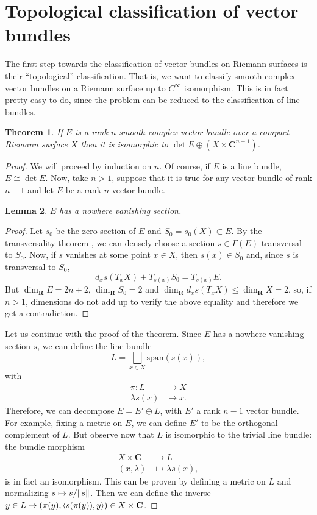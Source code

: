 \documentclass[12pt,a4paper]{book}
\newtheorem{thm}{Theorem}[section]
\newtheorem{lema}[thm]{Lemma}
\theoremstyle{definition} \newtheorem{defn}[thm]{Definition}
\theoremstyle{definition} \newtheorem{ejemplo}[thm]{Example}
\theoremstyle{remark} \newtheorem{rem}[thm]{Remark}
\def\CC{\mathbf{C}}
\def\RR{\mathbf{R}}
\def\Span{\mathrm{span}}
\DeclarePairedDelimiter\esc{\langle}{\rangle}
\DeclarePairedDelimiter\norm{\lVert}{\rVert}
\begin{document}
\section{Topological classification of vector bundles}
The first step towards the classification of vector bundles on Riemann surfaces is their ``topological'' classification. That is, we want to classify smooth complex vector bundles on a Riemann surface up to $C^\infty$ isomorphism. This is in fact pretty easy to do, since the problem can be reduced to the classification of line bundles.
\begin{thm}
  If $E$ is a rank $n$ smooth complex vector bundle over a compact Riemann surface $X$ then it is isomorphic to $\det E \oplus (X\times \CC^{n-1})$.
\end{thm}
\begin{proof}
   We will proceed by induction on $n$. Of course, if $E$ is a line bundle, $E\cong \det E$. Now, take $n>1$, suppose that it is true for any vector bundle of rank $n-1$ and let $E$ be a rank $n$ vector bundle.
   \begin{lema}
     $E$ has a nowhere vanishing section.
   \end{lema}
   \begin{proof}
     Let $s_0$ be the zero section of $E$ and $S_0=s_0(X)\subset E$. By the transversality theorem \cite{hirsch}, we can densely choose a section $s\in \Gamma(E)$ transversal to $S_0$. Now, if $s$ vanishes at some point $x\in X$, then $s(x)\in S_0$ and, since $s$ is transversal to $S_0$, $$d_xs(T_xX) + T_{s(x)}S_0 = T_{s(x)}E.$$ But $\dim_\RR E=2n+2$, $\dim_\RR S_0 = 2$ and $\dim_\RR d_xs(T_xX) \leq \dim_\RR X = 2$, so, if $n>1$, dimensions do not add up to verify the above equality and therefore we get a contradiction. 
   \end{proof}

   Let us continue with the proof of the theorem. Since $E$ has a nowhere vanishing section $s$, we can define the line bundle
   \begin{equation*}
     L=\bigsqcup_{x\in X} \Span(s(x)),
   \end{equation*}
   with 
   \begin{align*}
      \pi:L&\longrightarrow X\\ 
       \lambda s(x) &\longmapsto x.
     \end{align*}
     Therefore, we can decompose $E=E'\oplus L$, with $E'$ a rank $n-1$ vector bundle. For example, fixing a metric on $E$, we can define $E'$ to be the orthogonal complement of $L$. But observe now that $L$ is isomorphic to the trivial line bundle: the bundle morphism
     \begin{align*}
      X\times \CC  &\longrightarrow L\\ 
	 (x,\lambda) &\longmapsto \lambda s(x), 
       \end{align*}
       is in fact an isomorphism. This can be proven by defining a metric on $L$ and normalizing $s \mapsto s/\norm{s}$. Then we can define the inverse
     $ y\in L \mapsto (\pi(y), \esc{s(\pi(y)),y})\in X\times \CC$. 


\end{proof}
\end{document}
